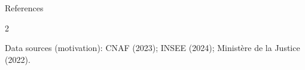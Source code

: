 \documentclass[aspectratio=169,10pt]{beamer}
\begin{document}
\begin{frame}[noframenumbering]{References}
\vspace{-0.3cm}
\scriptsize
\begin{multicols}{2}
  \setlength{\parskip}{3pt}
  \printbibliography[heading=none]


  {\color{textgrey}Data sources (motivation): CNAF (2023); INSEE (2024); Minist\`ere de la Justice (2022).}
\end{multicols}
\end{frame}
\end{document}
